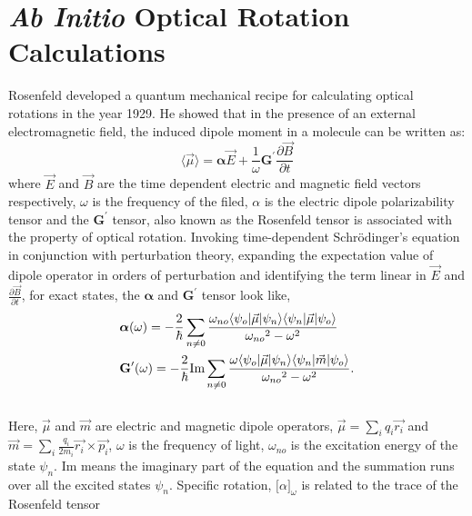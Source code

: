 \section{{\em Ab Initio} Optical Rotation Calculations}
Rosenfeld developed a quantum mechanical recipe for calculating optical rotations in the year
1929\cite{Rosenfeld29}. He showed that in the presence of an external electromagnetic field,
the induced dipole moment in a molecule can be written as:
\begin{equation}\langle\vec{\mu}\rangle = \bm{\alpha}\vec{E} + \frac{1}{\omega}\textbf{G}^\prime\frac{\partial\vec{B}}{\partial t}
\end{equation} where $\vec{E} $ and $\vec{B}$ are the time dependent electric and
magnetic field vectors respectively, $\omega$ is the frequency of the filed, $\alpha$ is the electric dipole
polarizability tensor and the $\textbf{G}^\prime$ tensor, also known as the Rosenfeld tensor is associated 
with the property of optical rotation. Invoking time-dependent Schr\"odinger's equation in conjunction 
with perturbation theory, expanding the expectation value of dipole operator in orders of perturbation 
and identifying the term linear in $\vec{E}$ and $\frac{\partial\vec{B}}{\partial t}$, 
for exact states, the $\bm{\alpha}$ and $\textbf{G}^\prime$ tensor look like,
\\
\begin{equation}
\begin{split}
& \mbox{\boldmath $\alpha$}(\omega) = -\frac{2}{\hbar} \sum_{n \neq 0}\frac{\omega_{no}\langle \psi_o |\vec{\mu}| \psi_n \rangle\langle \psi_n |\vec{\mu}| \psi_o \rangle}{{\omega_{no}}^2 - {\omega}^2 }\\
& \textbf{G}^{\prime}(\omega) = -\frac{2}{\hbar} \text{Im}\sum_{n \neq 0}\frac{\omega \langle \psi_o |\vec{\mu}| \psi_n \rangle\langle \psi_n |\vec{m}| \psi_o \rangle}{{\omega_{no}}^2 - {\omega}^2 }.\\
\end{split}
\end{equation}
\\
Here, $\vec{\mu}$ and $\vec{m}$ are electric and magnetic dipole operators, 
$\vec{\mu} = \sum\limits_i q_i \vec{{r}_i}$ and $\vec{m} = \sum\limits_i \frac{q_i}{2m_i} \vec{{r}_i} \times \vec{{p}_i}$, $\omega$ is the frequency of light, $\omega_{no}$ is the excitation energy of the state $\psi_n$.
Im means the imaginary part of the equation and the summation runs over all the excited
states $\psi_n$. Specific rotation, ${\lbrack\alpha\rbrack}_\omega$ is related to the trace of the Rosenfeld tensor 
